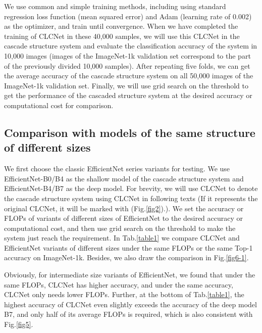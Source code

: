 \documentclass{article}
\begin{document}
We use common and simple training methods, including using standard regression loss function (mean squared error) and Adam \cite{kingma2014adam} (learning rate of 0.002) as the optimizer, and train until convergence. When we have completed the training of CLCNet in these 40,000 samples, we will use this CLCNet in the cascade structure system and evaluate the classification accuracy of the system in 10,000 images (images of the ImageNet-1k validation set correspond to the part of the previously divided 10,000 samples). After repeating five folds, we can get the average accuracy of the cascade structure system on all 50,000 images of the ImageNet-1k validation set. Finally, we will use grid search on the threshold to get the performance of the cascaded structure system at the desired accuracy or computational cost for comparison.

\subsection{Comparison with models of the same structure of different sizes}
We first choose the classic EfficientNet \cite{tan2019efficientnet} series variants for testing. We use EfficientNet-B0/B4 as the shallow model of the cascade structure system and EfficientNet-B4/B7 as the deep model. For brevity, we will use CLCNet to denote the cascade structure system using CLCNet in following texts (If it represents the original CLCNet, it will be marked with (Fig.\ref{fig2}).). We set the accuracy or FLOPs of variants of different sizes of EfficientNet to the desired accuracy or computational cost, and then use grid search on the threshold to make the system just reach the requirement. In Tab.\ref{table1} we compare CLCNet and EfficientNet variants of different sizes under the same FLOPs or the same Top-1 accuracy on ImageNet-1k. Besides, we also draw the comparison in Fig.\ref{fig6-1}.


Obviously, for intermediate size variants of EfficientNet, we found that under the same FLOPs, CLCNet has higher accuracy, and under the same accuracy, CLCNet only needs lower FLOPs. Further, at the bottom of Tab.\ref{table1}, the highest accuracy of CLCNet even slightly exceeds the accuracy of the deep model B7, and only half of its average FLOPs is required, which is also consistent with Fig.\ref{fig5}.
\end{document}
